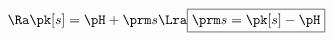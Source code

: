 \documentclass[../../main/main.tex]{subfiles}
\begin{document}
\begin{tcb*}
\begin{minipage}[c]{.69\linewidth}
{\begin{gather*}
				\\\Ra
				\pk[s] = \pH + \prm s
				\Lra
				\boxed{\prm s = \pk[s] - \pH}
			\end{gather*}
		}
	\end{minipage}
	\hfill
	\begin{minipage}[c]{.30\linewidth}
		\begin{center}
		\end{center}
	\end{minipage}
\end{tcb*}
\end{document}
